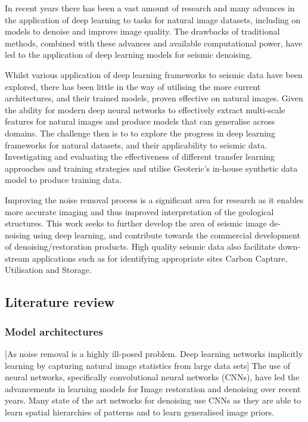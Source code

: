 \documentclass[project-plan]{report-template}
\begin{document}
In recent years there has been a vast amount of research and many advances in the application of deep learning to tasks for natural image datasets, including on models to denoise and improve image quality. The drawbacks of traditional methods, combined with these advances and available computational power, have led to the application of deep learning models for seismic denoising.

Whilst various application of deep learning frameworks to seismic data have been explored, there has been little in the way of utilising the more current architectures, and their trained models, proven effective on natural images. Given the ability for modern deep neural networks to effectively extract multi-scale features for natural images and produce models that can generalise across domains. The challenge then is to to explore the progress in deep learning frameworks for natural datasets, and their applicability to seismic data. Investigating and evaluating the effectiveness of different transfer learning approaches and training strategies and utilise Geoteric's in-house synthetic data model to produce training data.

Improving the noise removal process is a significant area for research as it enables more accurate imaging and thus improved interpretation of the geological structures. This work seeks to further develop the area of seismic image de-noising using deep learning, and contribute towards the commercial development of denoising/restoration products. High quality seismic data also facilitate down-stream applications such as for identifying appropriate sites Carbon Capture, Utilisation and Storage.

\subsection{Literature review}
\subsubsection{Model architectures}
[As noise removal is a highly ill-posed problem. Deep learning networks implicitly learning by capturing natural image statistics from large data sets]
The use of neural networks, specifically convolutional neural networks (CNNs), have led the advancements in learning models for Image restoration and denoising over recent years. Many state of the art networks for denoising use CNNs as they are able to learn spatial hierarchies of patterns and to learn generalised image priors.
\end{document}
